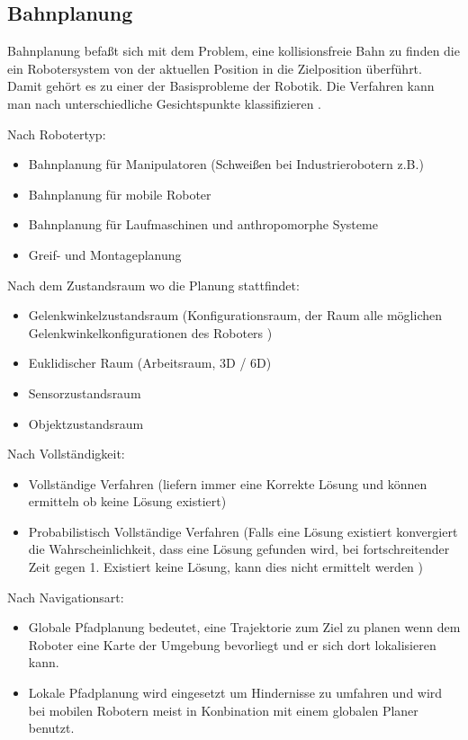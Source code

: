 \label{bahnplanung_grundlagen_sec}
\authorsection{\editoroier}
\subsection{Bahnplanung}

Bahnplanung befaßt sich mit dem Problem, eine kollisionsfreie Bahn zu finden die  ein Robotersystem
von der aktuellen Position in die Zielposition überführt. Damit gehört es zu einer der Basisprobleme der Robotik. Die Verfahren kann man nach unterschiedliche Gesichtspunkte klassifizieren \cite{rob1}.

Nach Robotertyp:
\begin{itemize}
\item Bahnplanung für Manipulatoren (Schweißen bei Industrierobotern z.B.)
\item Bahnplanung für mobile Roboter
\item Bahnplanung für Laufmaschinen und anthropomorphe Systeme
\item Greif- und Montageplanung
\end{itemize}

Nach dem Zustandsraum wo die Planung stattfindet:
\begin{itemize}
\item Gelenkwinkelzustandsraum (Konfigurationsraum, der Raum alle möglichen Gelenkwinkelkonfigurationen des Roboters )
\item Euklidischer Raum (Arbeitsraum, 3D / 6D)
\item Sensorzustandsraum
\item Objektzustandsraum
\end{itemize}

Nach Vollständigkeit:
\begin{itemize}
\item Vollständige Verfahren (liefern immer eine Korrekte Lösung und können ermitteln ob keine Lösung existiert)
\item Probabilistisch Vollständige Verfahren (Falls eine Lösung existiert konvergiert die Wahrscheinlichkeit, dass eine Lösung gefunden wird, bei fortschreitender Zeit gegen 1. Existiert keine Lösung, kann dies nicht ermittelt werden
)
\end{itemize}

Nach Navigationsart:
\begin{itemize}
\item Globale Pfadplanung bedeutet, eine Trajektorie zum Ziel zu planen wenn dem Roboter eine Karte der Umgebung bevorliegt und er sich dort lokalisieren kann.
\item Lokale Pfadplanung wird eingesetzt um Hindernisse zu umfahren und wird bei mobilen Robotern meist in Konbination mit einem globalen Planer benutzt. 
\end{itemize}

